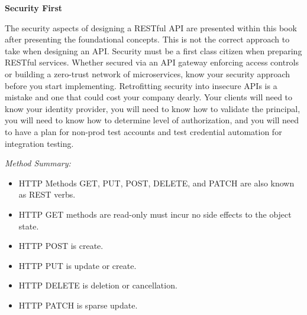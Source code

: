 \begin{sidebar}
\begin{center}
\textbf{Security First}
\end{center}

The security aspects of designing a RESTful API are presented within this book after presenting the foundational concepts.  This is not the correct approach to take when designing an API.  Security must be a first class citizen when preparing RESTful services.  Whether secured via an API gateway enforcing access controls or building a zero-trust network of microservices, know your security approach before you start implementing.  Retrofitting security into insecure APIs is a mistake and one that could cost your company dearly.  Your clients will need to know your identity provider, you will need to know how to validate the principal, you will need to know how to determine level of authorization, and you will need to have a plan for non-prod test accounts and test credential automation for integration testing.

\end{sidebar}

\emph{Method Summary:}

\begin{itemize}
  \item HTTP Methods GET, PUT, POST, DELETE, and PATCH are also known as REST verbs.
  \item HTTP GET methods are read-only must incur no side effects to the object state.
  \item HTTP POST is create.
  \item HTTP PUT is update or create.
  \item HTTP DELETE is deletion or cancellation.
  \item HTTP PATCH is sparse update.
\end{itemize}
